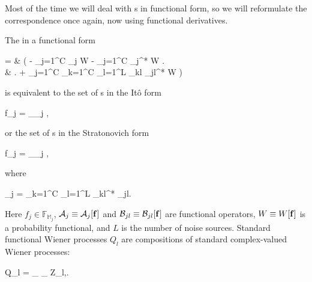 Most of the time we will deal with s in functional form, so we will reformulate the correspondence once again, now using functional derivatives.

\begin{theorem}
\label{thm:fpe-sde:corr:fpe-sde-func}
	The  in a functional form
	\begin{eqn*}
		={} & \int \upd\xvec \left(
			- \sum_{j=1}^C  _j W
			- \sum_{j=1}^C  _j^* W \right. \\
		& \left. + \sum_{j=1}^C \sum_{k=1}^C 
				\sum_{l=1}^L \mathcal{B}_{kl} _{jl}^* W
		\right)
	\end{eqn*}
	is equivalent to the set of s in the It\^o form
	\begin{eqn*}
		\upd f_j = _{\restbasis_j} \left[
			\mathcal{A}_j \upd t
			+ \sum_{l=1}^L _{jl} \upd Q_l
		\right],
	\end{eqn*}
	or the set of s in the Stratonovich form
	\begin{eqn*}
		\upd f_j = _{\restbasis_j} \left[
			(\mathcal{A}_j - \mathcal{S}_j) \upd t
			+ \sum_{l=1}^L \mathcal{B}_{jl} \upd Q_l
		\right],
	\end{eqn*}
	where
	\begin{eqn*}
		_j =  \sum_{k=1}^C \sum_{l=1}^L
			\mathcal{B}_{kl}^*
			\frac{\fdelta}{\fdelta f_k^*}
			\mathcal{B}_{jl}.
	\end{eqn*}
	Here $f_j \in \mathbb{F}_{\mathbb{M}_j}$, $\mathcal{A}_j \equiv \mathcal{A}_j[\mathbf{f}]$ and $\mathcal{B}_{jl} \equiv \mathcal{B}_{jl}[\mathbf{f}]$ are functional operators, $W \equiv W[\mathbf{f}]$ is a probability functional, and $L$ is the number of noise sources.
	Standard functional Wiener processes $Q_l$ are compositions of standard complex-valued Wiener processes:
	\begin{eqn*}
		Q_l = \sum_{\nvec \in \fullbasis} \phi_{\nvec} Z_{l,\nvec}.
	\end{eqn*}
\end{theorem}
